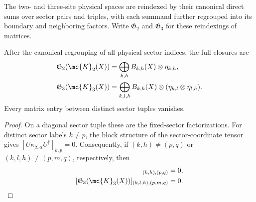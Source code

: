 \begin{definition}
    \label{def:mpdo_global_sector_closure_coordinates}
    \leanok
    The two- and three-site physical spaces are reindexed by their canonical
    direct sums over sector pairs and triples, with each summand further
    regrouped into its boundary and neighboring factors. Write
    $\mathfrak G_2$ and $\mathfrak G_3$ for these reindexings of matrices.
\end{definition}

\begin{lemma}
    \label{thm:mpdo_global_sector_closure_decomposition}
    \leanok
    After the canonical regrouping of all physical-sector indices, the full
    closures are
    \begin{align}
        \mathfrak G_2(\mc{K}_2(X))
         & =\bigoplus_{k,h}B_{k,h}(X)\otimes\eta_{k,h},
        \notag                                          \\
        \mathfrak G_3(\mc{K}_3(X))
         & =\bigoplus_{k,l,h}B_{k,h}(X)\otimes
        (\eta_{k,l}\otimes\eta_{l,h}).
        \notag
    \end{align}
    Every matrix entry between distinct sector tuples vanishes.
\end{lemma}

\begin{proof}
    \leanok
    On a diagonal sector tuple these are the fixed-sector factorizations.
    For distinct sector labels $k\ne p$, the block structure of the
    sector-coordinate tensor gives
    $[U\kappa_{\beta,\alpha}U^\dagger]_{k,p}=0$.
    Consequently, if $(k,h)\ne(p,q)$ or
    $(k,l,h)\ne(p,m,q)$, respectively, then
    \begin{align}
        [\mathfrak G_2(\mc{K}_2(X))]_{(k,h),(p,q)}
         & =0,
        \notag \\
        [\mathfrak G_3(\mc{K}_3(X))]_{(k,l,h),(p,m,q)}
         & =0.
        \notag
    \end{align}
\end{proof}

